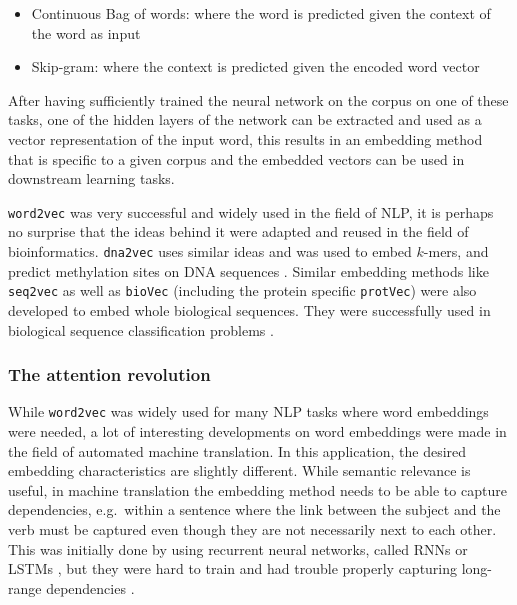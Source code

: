 \documentclass[
  11pt,
  twoside,
  BCOR=10mm,
  listof=totoc]{scrbook}
\begin{document}
\begin{itemize}
\item
  Continuous Bag of words: where the word is predicted given the context of the word as input
\item
  Skip-gram: where the context is predicted given the encoded word vector
\end{itemize}

After having sufficiently trained the neural network on the corpus on one of these tasks, one of the hidden layers of the network can be extracted and used as a vector representation of the input word, this results in an embedding method that is specific to a given corpus and the embedded vectors can be used in downstream learning tasks.

\texttt{word2vec} was very successful and widely used in the field of NLP, it is perhaps no surprise that the ideas behind it were adapted and reused in the field of bioinformatics. \texttt{dna2vec} \autocite{ngDna2vecConsistentVector2017} uses similar ideas and was used to embed \(k\)-mers, and predict methylation sites on DNA sequences \autocite{liangHyb4mCHybridDNA2vecbased2022}. Similar embedding methods like \texttt{seq2vec} \autocite{kimothiDistributedRepresentationsBiological2016} as well as \texttt{bioVec} (including the protein specific \texttt{protVec}) \autocite{asgariContinuousDistributedRepresentation2015} were also developed to embed whole biological sequences. They were successfully used in biological sequence classification problems \autocite{kimothiMetricLearningBiological2017}.

\hypertarget{the-attention-revolution}{%
\subsubsection{The attention revolution}\label{the-attention-revolution}}

While \texttt{word2vec} was widely used for many NLP tasks where word embeddings were needed, a lot of interesting developments on word embeddings were made in the field of automated machine translation. In this application, the desired embedding characteristics are slightly different. While semantic relevance is useful, in machine translation the embedding method needs to be able to capture dependencies, e.g.~within a sentence where the link between the subject and the verb must be captured even though they are not necessarily next to each other. This was initially done by using recurrent neural networks, called RNNs or LSTMs \autocite{beplerLearningProteinSequence2019}, but they were hard to train and had trouble properly capturing long-range dependencies \autocite{songPretrainingModelBiological2021}.
\end{document}
